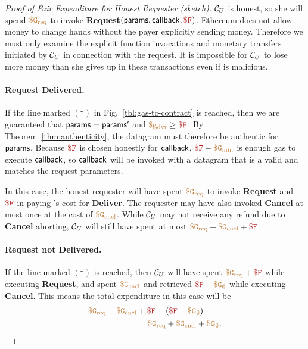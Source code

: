 \begin{proof}[Proof of Fair Expenditure for Honest Requester (sketch)]
${\cal C}_U$ is honest, so she will spend $\tt {\color{brown} \$G_\text{req} }$ to invoke {\bf Request}$(\dgform, \dgcallback, \consthonestfee)$.
Ethereum does not allow money to change hands without the payer explicitly sending money.
Therefore we must only examine the explicit function invocations and monetary transfers initiated by ${\cal C}_U$ in connection with the request.
It is impossible for ${\cal C}_U$ to lose more money than she gives up in these transactions even if \tc is malicious.

\paragraph{Request Delivered.}
If the line marked $(\dagger)$ in Fig.~\ref{tbl:gas-tc-contract} is reached,
then we are guaranteed that ${\sf params} = {\sf params}'$ and $\gasdeliver \geq \consthonestfee$.
By Theorem~\ref{thm:authenticity}, the datagram must therefore be authentic for ${\sf params}$.
Because $\consthonestfee$ is chosen honestly for ${\sf callback}$, $\consthonestfee - \constgasmin$ is enough gas to execute ${\sf callback}$,
so ${\sf callback}$ will be invoked with a datagram that is a valid and matches the request parameters.

In this case, the honest requester will have spent $\tt {\color{brown} \$G_\text{req} }$ to invoke {\bf Request} and $\consthonestfee$ in paying \tc's cost for {\bf Deliver}.
The requester may have also invoked {\bf Cancel} at most once at the cost of $\tt {\color{brown} \$G_\text{cncl} }$.
While ${\cal C}_U$ may not receive any refund due to {\bf Cancel} aborting, ${\cal C}_U$ will still have spent at most $\constgasrequest + \constgasinvokecancel + \consthonestfee$.


\paragraph{Request not Delivered.}
If the line marked $(\ddagger)$ is reached, then ${\cal C}_U$ will have spent
$\constgasrequest + \consthonestfee$ while executing {\bf Request},
and spent $\tt {\color{brown} \$G_\text{cncl} }$ and retrieved $\consthonestfee - \constgascancel$ while executing {\bf Cancel}.
This means the total expenditure in this case will be
\begin{align*}
  \constgasrequest + \constgasinvokecancel & + \consthonestfee - (\consthonestfee - \constgascancel) \\
                                           & = \constgasrequest + \constgasinvokecancel + \constgascancel.
\end{align*}
\end{proof}


